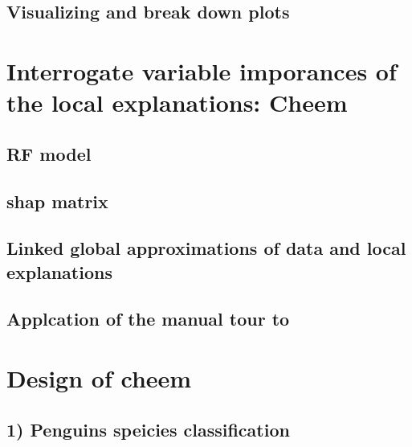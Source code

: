 \documentclass[
]{article}
\begin{document}
\hypertarget{visualizing-and-break-down-plots}{%
\subsection{Visualizing and break down plots}\label{visualizing-and-break-down-plots}}

\hypertarget{interrogate-variable-imporances-of-the-local-explanations-cheem}{%
\section{Interrogate variable imporances of the local explanations: Cheem}\label{interrogate-variable-imporances-of-the-local-explanations-cheem}}

\hypertarget{rf-model}{%
\subsection{RF model}\label{rf-model}}

\hypertarget{shap-matrix}{%
\subsection{shap matrix}\label{shap-matrix}}

\hypertarget{linked-global-approximations-of-data-and-local-explanations}{%
\subsection{Linked global approximations of data and local explanations}\label{linked-global-approximations-of-data-and-local-explanations}}

\hypertarget{applcation-of-the-manual-tour-to}{%
\subsection{Applcation of the manual tour to}\label{applcation-of-the-manual-tour-to}}

\hypertarget{design-of-cheem}{%
\section{Design of cheem}\label{design-of-cheem}}

\hypertarget{penguins-speicies-classification}{%
\subsection{1) Penguins speicies classification}\label{penguins-speicies-classification}}
\end{document}
